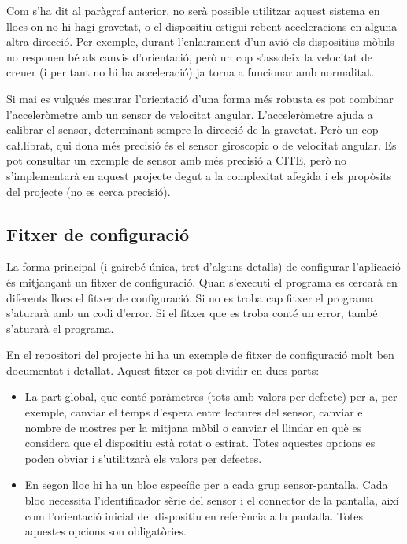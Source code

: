 Com s'ha dit al paràgraf anterior, no serà possible utilitzar aquest sistema en
llocs on no hi hagi gravetat, o el dispositiu estigui rebent acceleracions en
alguna altra direcció. Per exemple, durant l'enlairament d'un avió els
dispositius mòbils no responen bé als canvis d'orientació, però un cop
s'assoleix la velocitat de creuer (i per tant no hi ha acceleració) ja torna
a funcionar amb normalitat.

Si mai es vulgués mesurar l'orientació d'una forma més robusta es pot combinar
l'acceleròmetre amb un sensor de velocitat angular. L'acceleròmetre ajuda a
calibrar el sensor, determinant sempre la direcció de la gravetat. Però un
cop ca\l.librat, qui dona més precisió és el sensor giroscopic o de velocitat
angular. Es pot consultar un exemple de sensor amb més precisió a CITE, però no
s'implementarà en aquest projecte degut a la complexitat afegida i els propòsits
del projecte (no es cerca precisió).

\subsection{Fitxer de configuració}

La forma principal (i gairebé única, tret d'alguns detalls) de configurar
l'aplicació és mitjançant un fitxer de configuració. Quan s'executi el programa
es cercarà en diferents llocs el fitxer de configuració. Si no es troba cap
fitxer el programa s'aturarà amb un codi d'error. Si el fitxer que es troba
conté un error, també s'aturarà el programa.

En el repositori del projecte hi ha un exemple de fitxer de configuració molt
ben documentat i detallat. Aquest fitxer es pot dividir en dues parts:

\begin{itemize}
    \item La part global, que conté paràmetres (tots amb valors per defecte) per
    a, per exemple, canviar el temps d'espera entre lectures del sensor, canviar
    el nombre de mostres per la mitjana mòbil o canviar el llindar en què es
    considera que el dispositiu està rotat o estirat. Totes aquestes opcions es
    poden obviar i s'utilitzarà els valors per defectes.
    \item En segon lloc hi ha un bloc específic per a cada grup sensor-pantalla.
    Cada bloc necessita l'identificador sèrie del sensor i el connector de la
    pantalla, així com l'orientació inicial del dispositiu en referència a la
    pantalla. Totes aquestes opcions son obligatòries.
\end{itemize}


